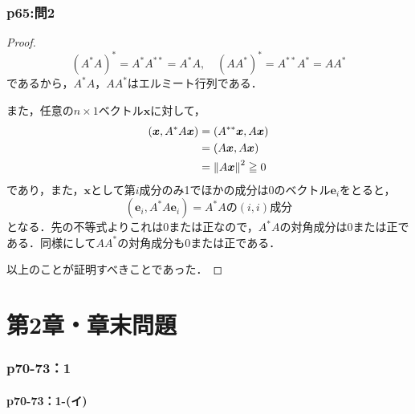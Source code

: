 \documentclass[a4paper,10pt,fleqn]{ltjsarticle}
\begin{document}
\section*{p65:問2}

\begin{tleftbar}
    \begin{proof}
        \[
            (A^\ast A)^{\ast} = A^{\ast} A^{\ast \ast} = A^{\ast} A, \quad (A A^{\ast})^\ast = A^{\ast \ast} A^\ast =A A^{\ast}
        \]
        であるから，$A^\ast A$，$A A^{\ast}$はエルミート行列である．

        また，任意の$n \times 1$ベクトル$\bm{x}$に対して，
        \begin{align*}
            (\bm{x}, A^{\ast}A \bm{x}) & = (A^{\ast \ast} \bm{x}, A \bm{x}) \\
                                       & = (A \bm{x}, A \bm{x})             \\
                                       & = \norm{A \bm{x}}^2 \geqq 0
        \end{align*}
        であり，また，$\bm{x}$として第$i$成分のみ1でほかの成分は$0$のベクトル$\bm{e}_i$をとると，
        \[
            (\bm{e}_i, A^{\ast}A \bm{e}_i) = \text{$A^{\ast}A$の$(i,i)$成分}
        \]
        となる．先の不等式よりこれは$0$または正なので，$A^{\ast}A$の対角成分は$0$または正である．同様にして$AA^{\ast}$の対角成分も$0$または正である．

        以上のことが証明すべきことであった．
    \end{proof}
\end{tleftbar}

\newpage
\part*{第2章・章末問題}

\section*{p70-73：1}

\subsection*{p70-73：1-(イ)}
\end{document}
